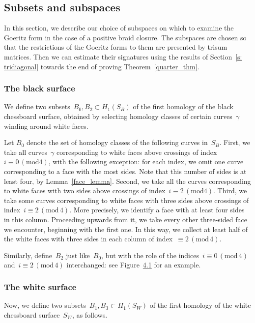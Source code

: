 \documentclass[10pt,a4paper]{amsart}
\numberwithin{equation}{section}
\newcommand{\rmod}{\mathrm{mod}}
\begin{document}
\subsection{Subsets and subspaces}
In this section, we describe our choice of subspaces on which to examine the Goeritz form in the case of a positive braid closure. The subspaces are chosen so that the restrictions of the Goeritz forms to them are presented by trisum matrices. Then we can estimate their signatures using the results of Section~\ref{s: tridiagonal} towards the end of proving Theorem~\ref{quarter_thm}.


\subsubsection{The black surface}

We define two subsets~$B_0, B_2 \subset H_1(S_B)$ of the first homology of the black chessboard surface, obtained by selecting homology classes of certain curves~$\gamma$ winding around white faces.


Let $B_0$ denote the set of homology classes of the following curves in~$S_B$. First, we take all curves~$\gamma$ corresponding to white faces above crossings of index~$i\equiv0\,(\rmod 4)$, with the following exception: for each index, we omit one curve corresponding to a face with the most sides. Note that this number of sides is at least four, by Lemma~\ref{face_lemma}. Second, we take all the curves corresponding to white faces with two sides above crossings of index~$i\equiv2\,(\rmod 4)$. Third, we take some curves corresponding to white faces with three sides above crossings of index~$i\equiv2\,(\rmod\,4)$. More precisely, we identify a face with at least four sides in this column. Proceeding upwards from it, we take every other three-sided face we encounter, beginning with the first one. In this way, we collect at least half of the white faces with three sides in each column of index~$\equiv2\,(\rmod\,4)$.


Similarly, define~$B_2$ just like~$B_0$, but with the role of the indices~$i\equiv0\,(\rmod\,4)$ and~$i\equiv2\,(\rmod\,4)$ interchanged: see Figure~\href{https://ahl.centre-mersenne.org/item/AHL_2024__7__823_0/}{4.1} for an example.



\subsubsection{The white surface}
Now, we define two subsets~$B_1, B_3 \subset H_1(S_W)$ of the first homology of the white chessboard surface~$S_W$, as follows.
\end{document}
